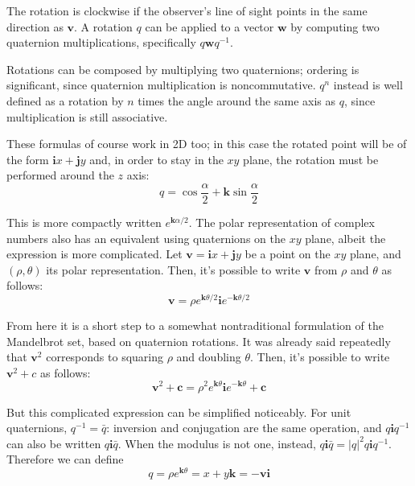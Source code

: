 \documentclass{article}
\let\vec\mathbf
\begin{document}
The rotation is clockwise if the observer's line of sight points in the
same direction as $\vec{v}$.  A rotation $q$ can be applied to a vector
$\vec{w}$ by computing two quaternion multiplications, specifically
$q\vec{w}q^{-1}$.

Rotations can be composed by multiplying two quaternions; ordering is
significant, since quaternion multiplication is noncommutative.  $q^n$
instead is well defined as a rotation by $n$ times the angle around the
same axis as $q$, since multiplication is still associative.

These formulas of course work in 2D too; in this case the rotated
point will be of the form $\vec{i}x+\vec{j}y$ and, in order to stay in
the $xy$ plane, the rotation must be performed around the $z$ axis:
\begin{equation*}
q = \cos \frac\alpha2 + \vec{k} \sin \frac\alpha2
\end{equation*}

\noindent
This is more compactly written $e^{\vec{k}\alpha/2}$.  The polar
representation of complex numbers also has an equivalent using
quaternions on the $xy$ plane, albeit the expression is more
complicated.  Let $\vec{v}=\vec{i}x+\vec{j}y$ be a point on the $xy$
plane, and $(\rho,\theta)$ its polar representation.  Then, it's
possible to write $\vec{v}$ from $\rho$ and $\theta$ as follows:
\begin{equation*}
\vec{v}=\rho e^{\vec{k}\theta/2} \vec{i} e^{-\vec{k}\theta/2}
\end{equation*}

From here it is a short step to a somewhat nontraditional formulation of
the Mandelbrot set, based on quaternion rotations.  It was already said
repeatedly that $\vec{v}^2$ corresponds to squaring $\rho$ and doubling
$\theta$.  Then, it's possible to write $\vec{v}^2+c$ as follows:
\begin{equation*}
\vec{v}^2+\vec{c}=\rho^2 e^{\vec{k}\theta} \vec{i} e^{-\vec{k}\theta}+\vec{c}
\end{equation*}

But this complicated expression can be simplified noticeably.  For unit
quaternions, $q^{-1}=\bar q$: inversion and conjugation are the same
operation, and $q\vec{i}q^{-1}$ can also be written $q\vec{i}\bar
q$.  When the modulus is not one, instead, $q\vec{i}\bar q = |q|^2
q\vec{i}q^{-1}$.  Therefore we can define
\begin{equation*}
q = \rho e^{\vec{k}\theta} = x + y\vec{k} = -\vec{v}\vec{i}
\end{equation*}
\end{document}
